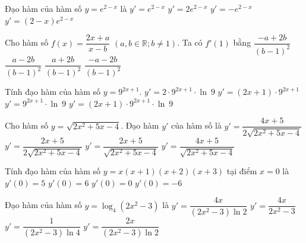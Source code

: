 \begin{ex}%
	 Đạo hàm của hàm số $y=e^{2-x}$ là
	\choice 
		 {$y'=e^{2-x}$}
		 {$y'=2e^{2-x}$}
		{\True  $y'=-e^{2-x}$}
		{$y'=(2-x)e^{2-x}$} 
\end{ex}

\begin{ex}%
	Cho hàm số $f(x)=\dfrac{2x+a}{x-b}$ $(a,b\in\mathbb{R};b\neq 1)$.  Ta có $f '(1)$ bằng
	 \choice
		 {$\dfrac{-a+2b}{(b-1)^2}$}
		 {$\dfrac{a-2b}{(b-1)^2}$}
		{$\dfrac{a+2b}{(b-1)^2}$} 
		{\True $\dfrac{-a-2b}{(b-1)^2}$} 
\end{ex}

\begin{ex}%
	 Tính đạo hàm của hàm số $y=9^{2x+1}$.
	 \choice
		{\True $y'=2 \cdot 9^{2x+1} \cdot  \ln~9$}
		{$y'=(2x+1) \cdot  9^{2x+1}$}
		{$y'=9^{2x+1} \cdot \ln~9$} 
		{$y'=(2x+1) \cdot  9^{2x+1} \cdot \ln~9$}
\end{ex}

\begin{ex}%
	Cho  hàm số $y=\sqrt{2x^2+5x-4}$. Đạo hàm $y'$ của hàm số là
	 \choice
		{\True  $y'=\dfrac{4x+5}{2\sqrt{2x^2+5x-4}}$}
		{$y'=\dfrac{2x+5}{2\sqrt{2x^2+5x-4}}$} 
		 {$y'=\dfrac{2x+5}{\sqrt{2x^2+5x-4}}$}
		 {$y'=\dfrac{4x+5}{\sqrt{2x^2+5x-4}}$}
\end{ex}

\begin{ex}%
	Tính  đạo hàm của hàm số $y=x(x+1)(x+2)(x+3)$ tại điểm $x=0$ là
	\choice 
		{$y'(0)=5$} 
		{\True $y'(0)=6$} 
		{$y'(0)=0$} 
		{$y'(0)=-6$} 
\end{ex}

\begin{ex}%
	Đạo hàm của hàm số $y=\log_4 \left(2x^2-3\right)$  là
	\choice 
		 {$y'=\dfrac{4x}{\left(2x^2-3\right)\ln 2}$}
		{$y'=\dfrac{4x}{2x^2-3}$} 
		{$y'=\dfrac{1}{\left(2x^2-3\right)\ln  4}$}
		{\True  $y'=\dfrac{2x}{\left(2x^2-3\right)\ln 2}$}
\end{ex}

